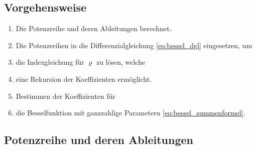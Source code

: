 \begin{refsection}
\subsection*{Vorgehensweise}
\begin{enumerate}
	\item Die Potenzreihe und deren Ableitungen berechnet.
	\item Die Potenzreihen in die Differenzialgleichung \ref{eq:bessel_dgl} eingesetzen, um
	\item die Indexgleichung f\"ur $\varrho$ zu l\"osen, welche
	\item eine Rekursion der Koeffizienten erm\"oglicht.
	\item Bestimmen der Koeffizienten f\"ur
	\item die Besselfunktion mit ganzzahlige Parametern \ref{eq:bessel_summenformel}.
\end{enumerate}


\subsection*{Potenzreihe und deren Ableitungen}


\end{refsection}
